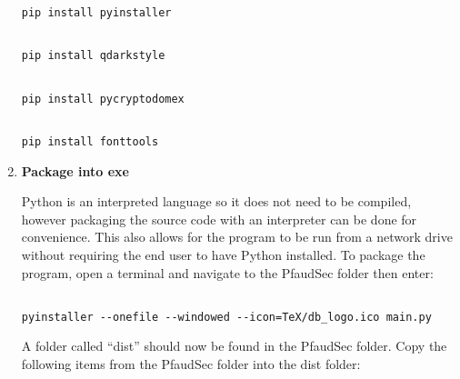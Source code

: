 \documentclass[14pt]{article}
\begin{document}
\begin{flushleft}
\begin{enumerate}
\begin{tcolorbox}[boxrule=0.5pt, colback=backgrey, colframe=bordergrey, sharpish corners]
\begin{verbatim}
pip install pyinstaller

\end{verbatim}
\end{tcolorbox}

\begin{tcolorbox}[boxrule=0.5pt, colback=backgrey, colframe=bordergrey, sharpish corners] 
\begin{verbatim}

pip install qdarkstyle

\end{verbatim}
\end{tcolorbox}


\begin{tcolorbox}[boxrule=0.5pt, colback=backgrey, colframe=bordergrey, sharpish corners] 
\begin{verbatim}

pip install pycryptodomex

\end{verbatim}
\end{tcolorbox}


\begin{tcolorbox}[boxrule=0.5pt, colback=backgrey, colframe=bordergrey, sharpish corners] 
\begin{verbatim}

pip install fonttools

\end{verbatim}
\end{tcolorbox}

\item \textbf{Package into exe}

Python is an interpreted language so it does not need to be compiled, however packaging the source code with an interpreter can be done for convenience.
This also allows for the program to be run from a network drive without requiring the end user to have Python installed.
To package the program, open a terminal and navigate to the PfaudSec folder then enter:

\begin{tcolorbox}[boxrule=0.5pt, colback=backgrey, colframe=bordergrey, sharpish corners] 
\begin{verbatim}

pyinstaller --onefile --windowed --icon=TeX/db_logo.ico main.py

\end{verbatim}
\end{tcolorbox}

A folder called ``dist'' should now be found in the PfaudSec folder.
Copy the following items from the PfaudSec folder into the dist folder:


\end{enumerate}
\end{flushleft}
\end{document}
